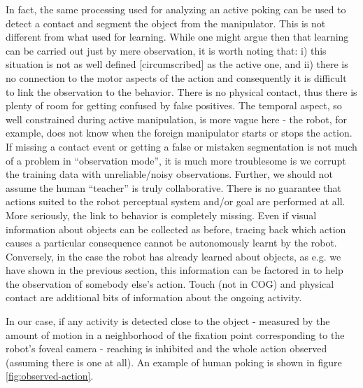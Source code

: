 In fact, the same processing used for analyzing an active poking 
can be used to detect a contact and segment the object from the manipulator.
This is not different from what used for learning. While one might argue then
that learning can be carried out just by mere observation, it is
worth noting that: i) this situation is not as well defined [circumscribed] 
as the active one, and ii) there is no connection to the motor aspects 
of the action and consequently it is difficult to link the observation to the behavior.
There is no physical contact, thus there is plenty of room for getting confused 
by false positives. The temporal aspect, so well constrained during active manipulation, is 
more vague here - the robot, for example, does not know when the foreign manipulator starts
or stops the action. If missing a contact event or getting a false or mistaken 
segmentation is not much of a problem in ``observation mode'', it is much more
troublesome is we corrupt the training data with unreliable/noisy observations.
Further, we should not assume the human ``teacher'' is truly collaborative. 
There is no guarantee that actions suited to the robot perceptual system and/or 
goal are performed at all.
More seriously, the link to behavior is completely missing. Even if visual 
information about objects can be collected as before, tracing back which action
causes a particular consequence cannot be autonomously learnt by the robot.
Conversely, in the case the robot has already learned about objects, 
as e.g. we have shown in the previous section, this information can be
factored in to help the observation of somebody else's action. Touch 
(not in COG) and physical contact are additional bits of information 
about the ongoing activity.

In our case, if any activity is detected close to the object - measured by the 
amount of motion in a neighborhood of the fixation point corresponding to the robot's foveal 
camera - reaching is inhibited and the whole action observed (assuming there 
is one at all). An example of human poking is shown in figure \ref{fig:observed-action}.

